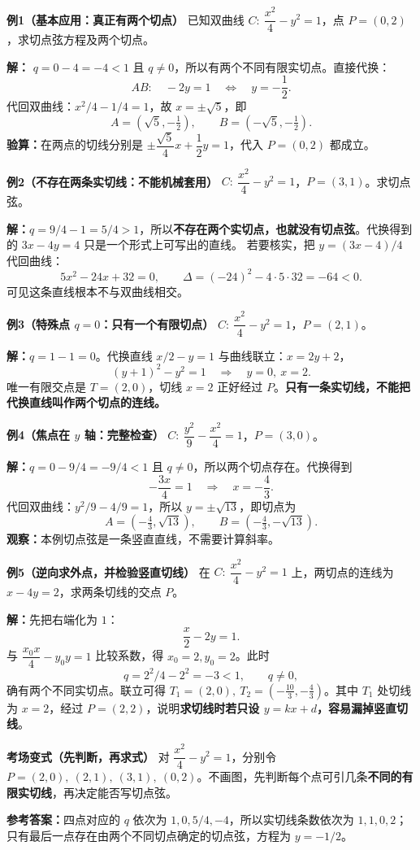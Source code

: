 \begin{examplebox}
\textbf{例1（基本应用：真正有两个切点）}
已知双曲线 $C:\ \dfrac{x^2}{4}-y^2=1$，点 $P=(0,2)$，求切点弦方程及两个切点。

\begin{center}

\end{center}
\textbf{解：} $q=0-4=-4<1$ 且 $q\ne0$，所以有两个不同有限实切点。直接代换：
\[AB:\quad -2y=1\quad\Longleftrightarrow\quad y=-\frac12.\]
代回双曲线：$x^2/4-1/4=1$，故 $x=\pm\sqrt5$，即
\[A=(\sqrt5,-\tfrac12),\qquad B=(-\sqrt5,-\tfrac12).\]
\textbf{验算：}在两点的切线分别是 $\pm\dfrac{\sqrt5}{4}x+\dfrac12y=1$，代入 $P=(0,2)$ 都成立。

\medskip
\begin{minipage}{\linewidth}
\textbf{例2（不存在两条实切线：不能机械套用）}
$C:\ \dfrac{x^2}{4}-y^2=1$，$P=(3,1)$。求切点弦。

\textbf{解：}$q=9/4-1=5/4>1$，所以\textbf{不存在两个实切点，也就没有切点弦}。代换得到的 $3x-4y=4$ 只是一个形式上可写出的直线。
若要核实，把 $y=(3x-4)/4$ 代回曲线：
\[5x^2-24x+32=0,\qquad\Delta=(-24)^2-4\cdot5\cdot32=-64<0.\]
可见这条直线根本不与双曲线相交。

\end{minipage}
\medskip
\textbf{例3（特殊点 $q=0$：只有一个有限切点）}
$C:\ \dfrac{x^2}{4}-y^2=1$，$P=(2,1)$。

\textbf{解：}$q=1-1=0$。代换直线 $x/2-y=1$ 与曲线联立：$x=2y+2$，
\[(y+1)^2-y^2=1\quad\Longrightarrow\quad y=0,\ x=2.\]
唯一有限交点是 $T=(2,0)$，切线 $x=2$ 正好经过 $P$。\textbf{只有一条实切线，不能把代换直线叫作两个切点的连线。}

\medskip
\textbf{例4（焦点在 $y$ 轴：完整检查）}
$C:\ \dfrac{y^2}{9}-\dfrac{x^2}{4}=1$，$P=(3,0)$。

\textbf{解：}$q=0-9/4=-9/4<1$ 且 $q\ne0$，所以两个切点存在。代换得到
\[-\frac{3x}{4}=1\quad\Longrightarrow\quad\boxed{x=-\frac43}.\]
代回双曲线：$y^2/9-4/9=1$，所以 $y=\pm\sqrt{13}$，即切点为
\[A=(-\tfrac43,\sqrt{13}),\qquad B=(-\tfrac43,-\sqrt{13}).\]
\textbf{观察：}本例切点弦是一条竖直直线，不需要计算斜率。

\medskip
\textbf{例5（逆向求外点，并检验竖直切线）}
在 $C:\ \dfrac{x^2}{4}-y^2=1$ 上，两切点的连线为 $x-4y=2$，求两条切线的交点 $P$。

\textbf{解：}先把右端化为 $1$：
\[\frac{x}{2}-2y=1.\]
与 $\dfrac{x_0x}{4}-y_0y=1$ 比较系数，得 $x_0=2,y_0=2$。此时
\[q=2^2/4-2^2=-3<1,\qquad q\ne0,\]
确有两个不同实切点。联立可得 $T_1=(2,0),\ T_2=(-\frac{10}{3},-\frac43)$。其中 $T_1$ 处切线为 $x=2$，经过 $P=(2,2)$，说明\textbf{求切线时若只设 $y=kx+d$，容易漏掉竖直切线}。

\medskip
\textbf{考场变式（先判断，再求式）}
对 $\dfrac{x^2}{4}-y^2=1$，分别令 $P=(2,0),\ (2,1),\ (3,1),\ (0,2)$。不画图，先判断每个点可引几条\textbf{不同的有限实切线}，再决定能否写切点弦。

\textbf{参考答案：}四点对应的 $q$ 依次为 $1,0,5/4,-4$，所以实切线条数依次为 $1,1,0,2$；只有最后一点存在由两个不同切点确定的切点弦，方程为 $y=-1/2$。
\end{examplebox}
